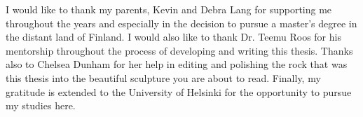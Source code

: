 

I would like to thank my parents, Kevin and Debra Lang for supporting me
throughout the years and especially in the decision to pursue a master's degree
in the distant land of Finland.
%
I would also like to thank Dr. Teemu Roos for his mentorship throughout the
process of developing and writing this thesis.
%
Thanks also to Chelsea Dunham for her help in editing and polishing the rock
that was this thesis into the beautiful sculpture you are about to read.
%
Finally, my gratitude is extended to the University of Helsinki for the
opportunity to pursue my studies here.

